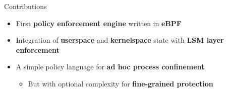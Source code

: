 \documentclass[12pt, dvipsnames, aspectratio=169]{beamer}
\begin{document}

\begin{frame}[c]{Contributions}
\begin{itemize}
    \item First \textbf{policy enforcement engine} written in \textbf{eBPF}
    \vfill
    \item Integration of \textbf{userspace} and \textbf{kernelspace} state with \textbf{LSM layer enforcement}
    \vfill
    \item A simple policy language for \textbf{ad hoc process confinement}
    \begin{itemize}
        \item But with optional complexity for \textbf{fine-grained protection}
    \end{itemize}
\end{itemize}
\end{frame}
\end{document}

